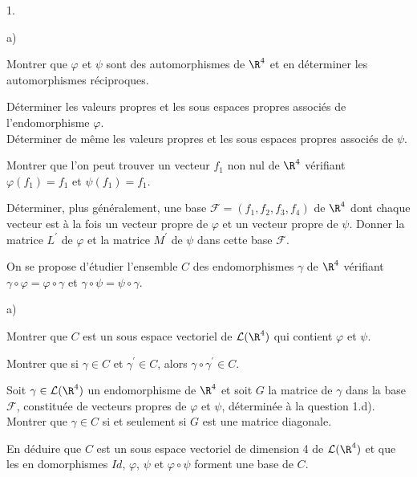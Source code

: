 \documentclass[11pt]{article}%
\begin{document}
\begin{noliste}{1.}
 \setlength{\itemsep}{4mm}
\item 

\begin{noliste}{a)}
 \setlength{\itemsep}{2mm}
\item Montrer que $\varphi $ et $\psi $ sont des automorphismes de
$\R^{4}$ et en déterminer les automorphismes réciproques.

\item Déterminer les valeurs propres et les sous espaces propres
associés de
l'endomorphisme $\varphi $.\\
Déterminer de même les valeurs propres et les sous espaces propres
associés
de $\psi $.

\item Montrer que l'on peut trouver un vecteur $f_{1}$ non nul de
$\R^{4}$ vérifiant $\varphi (f_{1}) = f_{1}$ et $\psi (f_{1}) = f_{1}$.

\item Déterminer, plus généralement, une base $\mathcal{F} =
(f_{1},f_{2},f_{3},f_{4})$ de $\R^{4}$ dont chaque vecteur est à la
fois un vecteur propre de $\varphi $ et un vecteur propre de $\psi $.
Donner
la matrice $L^{\prime }$ de $\varphi $ et la matrice $M^{\prime }$ de
$\psi $
dans cette base $\mathcal{F}$.
\end{noliste}

\item On se propose d'étudier l'ensemble $C$ des endomorphismes $\gamma
$ de
$\R^{4}$ vérifiant $\gamma \circ \varphi = \varphi \circ \gamma $ et
$\gamma \circ \psi = \psi \circ \gamma $.

\begin{noliste}{a)}
 \setlength{\itemsep}{2mm}
\item Montrer que $C$ est un sous espace vectoriel de
$\mathcal{L}(\R^{4})$ qui contient $\varphi $ et $\psi $.

\item Montrer que si $\gamma \in C$ et $\gamma ^{\prime }\in C$, alors
$\gamma \circ \gamma ^{\prime }\in C$.

\item Soit $\gamma \in \mathcal{L}(\R^{4})$ un endomorphisme de
$\R^{4}$ et soit $G$ la matrice de $\gamma $ dans la base $\mathcal{F}
$, constituée de vecteurs propres de $\varphi $ et $\psi $, déterminée
à la
question 1.d). Montrer que $\gamma \in C$ si et seulement si $G$ est
une
matrice diagonale.

\item En déduire que $C$ est un sous espace vectoriel de dimension 4 de
$\mathcal{L}(\R^{4})$ et que les en domorphismes $Id$, $\varphi $,
$\psi $ et $\varphi \circ \psi $ forment une base de $C$.
\end{noliste}
\end{noliste}
\end{document}
